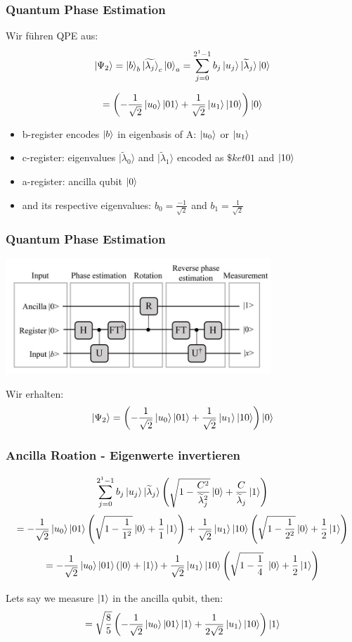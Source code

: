 \begin{frame}
    \frametitle{Quantum Phase Estimation}
    
    Wir führen QPE aus:
    $$\ket{\Psi_2} = \ket{b}_b \ket{\widetilde{\lambda_j}}_c\ket{0}_a
     =\sum_{j=0}^{2^{1}-1} b_j \ket{u_j} \ket{ \widetilde{\lambda}_j} \ket{0}$$

    $$=\left(-\frac{1}{\sqrt{2}} \ket{u_0} \ket{01} +\frac{1}{\sqrt{2}}  
    \ket{u_1} \ket{10} \right)  \ket{0}$$
    \begin{itemize}
    \item b-register encodes $\ket{b}$ in eigenbasis of A: $ \ket{u_0}$ or $\ket{u_1}$
    \item c-register: eigenvalues $|\widetilde{\lambda}_0⟩$ and $|\widetilde{\lambda}_1⟩$ encoded as  $\$ket{01}$ and $\ket{10}$
    \item a-register: ancilla qubit $\ket{0}$ 
    \item and its respective eigenvalues: $b_0 =\frac{-1}{\sqrt{2}}$ and  $b_1 =\frac{1}{\sqrt{2}}$
    \end{itemize}
\end{frame}

\begin{frame}
    \frametitle{Quantum Phase Estimation}
    \begin{center}
    \includegraphics[width=10cm]{img/hhl_circuit.jpg}
    \end{center}

    Wir erhalten:
    $$\ket{\Psi_2} =\left(-\frac{1}{\sqrt{2}} \ket{u_0} \ket{01} +\frac{1}{\sqrt{2}}  
    \ket{u_1} \ket{10} \right)  \ket{0}$$

\end{frame}




\begin{frame}
    \frametitle{Ancilla Roation - Eigenwerte invertieren}
    $$\sum_{j=0}^{2^{1}-1} b_j \ket{u_j} \ket{\widetilde{\lambda}_j} \left(\sqrt{1-\frac{C^2}{\widetilde{\lambda}_j^2}}\ket{0} + \frac{C}{\widetilde{\lambda}_j} \ket{1}\right)$$
    $$=-\frac{1}{\sqrt{2}} \ket{u_0} \ket{01}\left(\sqrt{1-\frac{1}{1^2}}\ket{0} + \frac{1}{1} \ket{1}\right) +\frac{1}{\sqrt{2}}  \ket{u_1} \ket{10} \left(\sqrt{1-\frac{1}{2^2}}\ket{0} + \frac{1}{2} \ket{1}\right)$$
    $$=-\frac{1}{\sqrt{2}} \ket{u_0} \ket{01}\left(\ket{0} +\ket{1}\right)+\frac{1}{\sqrt{2}} \ket{u_1} \ket{10}\left(\sqrt{1-\frac{1}{4}}\ \ket{0} + \frac{1}{2} \ket{1}\right)$$

    \hfil

    Lets say we measure $\ket{1}$ in the ancilla qubit, then:
    $$  =\sqrt{\frac{8}{5}}\left(-\frac{1}{\sqrt{2}} \ket{u_0}\ket{01}\ket{1} +\frac{1}{2\sqrt{2}} \ket{u_1} \ket{10}\right)\ket{1}$$
\end{frame}


